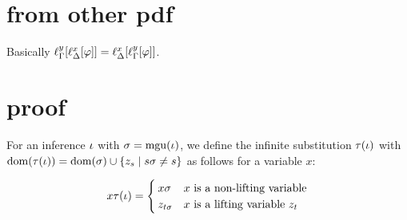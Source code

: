 \documentclass[,%
	draft=false,%
	numbers=noendperiod
	11pt,
	a4paper,
	oneside,%
	openany,
]{memoir}
\begin{document}
\tableofcontents

\section{from other pdf}
\begin{lemma}
	\label{lemma:lifting_order_not_relevant}
	Basically $\ell_{\Gamma}^{y}[\ell_{\Delta}^{x}[\varphi]] = \ell_{\Delta}^{x}[\ell_{\Gamma}^{y}[\varphi]]$.
\end{lemma}

\clearpage

\section{proof}

\begin{defi}[$\tau(\inference)$]
	For an inference $\iota$ with $\sigma = \operatorname{mgu}(\iota)$, we define the infinite substitution $\tau(\inference)$ with $\operatorname{dom}(\tau(\iota)) = \operatorname{dom}(\sigma) \cup \{z_s \mid s\sigma \neq s\}$ as follows for a variable $x$:

	\[
		x\tau(\iota) =
		\begin{cases}
			x\sigma & \text{$x$ is a non-lifting variable} \\
			z_{t\sigma} & \text{$x$ is a lifting variable $z_t$}
		\end{cases} 
	\]
\end{defi}
\end{document}
